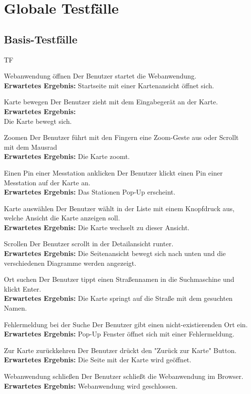 \section{Globale Testfälle}
\setcounter{counter}{10}
\subsection{Basis-Testfälle}
\begin{Kriterien}{TF}

	\item[Webanwendung öffnen] Der Benutzer startet die \gls{Webanwendung}. \\ \textbf{Erwartetes Ergebnis:} Startseite mit einer Kartenansicht öffnet sich.

	\item[Karte bewegen] Der Benutzer zieht mit dem Eingabegerät an der Karte. \textbf{Erwartetes Ergebnis:} \\ Die Karte bewegt sich.
	
	\item[Zoomen] Der Benutzer führt mit den Fingern eine Zoom-Geste aus oder Scrollt mit dem Mausrad \\ \textbf{Erwartetes Ergebnis:} Die Karte zoomt.
	
	\item[Einen Pin einer Messtation anklicken] Der Benutzer klickt einen Pin einer Messtation auf der Karte an. \\ \textbf{Erwartetes Ergebnis:} Das Stationen Pop-Up erscheint.
	
	\item[Karte auswählen] Der Benutzer wählt in der Liste mit einem Knopfdruck aus, welche Ansicht die Karte anzeigen soll. \\ \textbf{Erwartetes Ergebnis:} Die Karte wechselt zu dieser Ansicht.
	
	\item[Scrollen] Der Benutzer scrollt in der Detailansicht runter. \\ \textbf{Erwartetes Ergebnis:} Die Seitenansicht bewegt sich nach unten und die verschiedenen Diagramme werden angezeigt.
	
	\item[Ort suchen] Der Benutzer tippt einen Straßennamen in die Suchmaschine und klickt Enter. \\ \textbf{Erwartetes Ergebnis:} Die Karte springt auf die Straße mit dem gesuchten Namen.
	
	\item[Fehlermeldung bei der Suche] Der Benutzer gibt einen nicht-existierenden Ort ein. \\ \textbf{Erwartetes Ergebnis:} Pop-Up Fenster öffnet sich mit einer Fehlermeldung.
	
	\item[Zur Karte zurückkehren] Der Benutzer drückt den "Zurück zur Karte" Button. \\ \textbf{Erwartetes Ergebnis:} Die Seite mit der Karte wird geöffnet. 
	
	\item[Webanwendung schließen] Der Benutzer schließt die Webanwendung im Browser. \\ \textbf{Erwartetes Ergebnis:} Webanwendung wird geschlossen.
\end{Kriterien}
